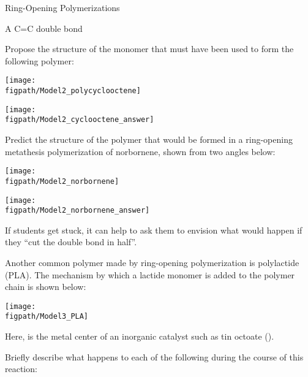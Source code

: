 \begin{activity}{Ring-Opening Polymerizations}
\begin{ctqs}
				\begin{solution}[0.5in]{}
					A C=C double bond
				\end{solution}
	
	\question Propose the structure of the monomer that must have been used to form the following polymer:
	
	\centerline{\texttt{[image: \\figpath/Model2\_polycyclooctene]}}
			
				\begin{solution}[1.25in]{}
					\centerline{\texttt{[image: \\figpath/Model2\_cyclooctene\_answer]}}
				\end{solution}
	
	\question Predict the structure of the polymer that would be formed in a ring-opening metathesis polymerization of norbornene, shown from two angles below:
	
	\centerline{\texttt{[image: \\figpath/Model2\_norbornene]}}
			
				\begin{solution}[1.25in]{}
					\centerline{\texttt{[image: \\figpath/Model2\_norbornene\_answer]}}
					
					If students get stuck, it can help to ask them to envision what would happen if they ``cut the double bond in half''.
				\end{solution}
	
\end{ctqs}

\vspace{\fill}

\begin{model}[Polylactide]
	\label{\labelbase:mdl:PLA}

	Another common polymer made by ring-opening polymerization is polylactide (PLA).  The mechanism by which a lactide monomer is added to the polymer chain is shown below:
	
	\centerline{\texttt{[image: \\figpath/Model3\_PLA]}}
	
	Here, \ce{[M]} is the metal center of an inorganic catalyst such as tin octoate ().
	
\end{model}

\clearpage
\begin{ctqs}
	
	\question Briefly describe what happens to each of the following during the course of this reaction:
	

\end{ctqs}
\end{activity}
